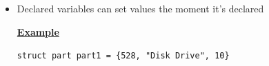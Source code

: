 \documentclass[12pt]{article}
\begin{document}
\begin{enumerate}[1.]
\begin{enumerate}[a)]
\begin{itemize}
\begin{itemize}
                \item Declared variables can set values the moment it's declared

                \bigskip

                \underline{\textbf{Example}}

                \bigskip

                \texttt{struct part part1 = \{528, "Disk Drive", 10\}}
            \end{itemize}
        \end{itemize}
    \end{enumerate}
\end{enumerate}
\end{document}
